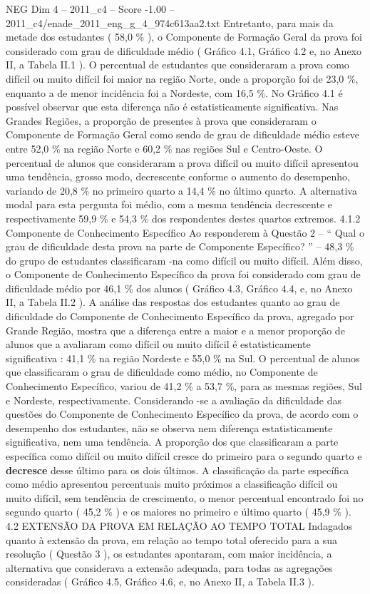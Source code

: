 \begin{textsample}{NEG Dim 4 – 2011\_c4 – Score -1.00 – 2011\_c4/enade\_2011\_eng\_g\_4\_974c613aa2.txt}
Entretanto, para mais da metade dos estudantes ( 58,0 \% ), o Componente de Formação Geral da prova foi considerado com grau de dificuldade médio ( Gráfico 4.1, Gráfico 4.2 e, no Anexo II, a Tabela II.1 ).
O percentual de estudantes que consideraram a prova como difícil ou muito difícil foi maior na região Norte, onde a proporção foi de 23,0 \%, enquanto a de menor incidência foi a Nordeste, com 16,5 \%.
No Gráfico 4.1 é possível observar que esta diferença não é estatisticamente significativa.
Nas Grandes Regiões, a proporção de presentes à prova que consideraram o Componente de Formação Geral como sendo de grau de dificuldade médio esteve entre 52,0 \% na região Norte e 60,2 \% nas regiões Sul e Centro-Oeste.
O percentual de alunos que consideraram a prova difícil ou muito difícil apresentou uma tendência, grosso modo, decrescente conforme o aumento do desempenho, variando de 20,8 \% no primeiro quarto a 14,4 \% no último quarto.
A alternativa modal para esta pergunta foi médio, com a mesma tendência decrescente e respectivamente 59,9 \% e 54,3 \% dos respondentes destes quartos extremos. 4.1.2 Componente de Conhecimento Específico Ao responderem à Questão 2 – “ Qual o grau de dificuldade desta prova na parte de Componente Específico? ” – 48,3 \% do grupo de estudantes classificaram -na como difícil ou muito difícil.
Além disso, o Componente de Conhecimento Específico da prova foi considerado com grau de dificuldade médio por 46,1 \% dos alunos ( Gráfico 4.3, Gráfico 4.4, e, no Anexo II, a Tabela II.2 ).
A análise das respostas dos estudantes quanto ao grau de dificuldade do Componente de Conhecimento Específico da prova, agregado por Grande Região, mostra que a diferença entre a maior e a menor proporção de alunos que a avaliaram como difícil ou muito difícil é estatisticamente significativa : 41,1 \% na região Nordeste e 55,0 \% na Sul.
O percentual de alunos que classificaram o grau de dificuldade como médio, no Componente de Conhecimento Específico, variou de 41,2 \% a 53,7 \%, para as mesmas regiões, Sul e Nordeste, respectivamente.
Considerando -se a avaliação da dificuldade das questões do Componente de Conhecimento Específico da prova, de acordo com o desempenho dos estudantes, não se observa nem diferença estatisticamente significativa, nem uma tendência.
A proporção dos que classificaram a parte específica como difícil ou muito difícil cresce do primeiro para o segundo quarto e \textbf{decresce} desse último para os dois últimos.
A classificação da parte específica como médio apresentou percentuais muito próximos a classificação difícil ou muito difícil, sem tendência de crescimento, o menor percentual encontrado foi no segundo quarto ( 45,2 \% ) e os maiores no primeiro e último quarto ( 45,9 \% ). 4.2 EXTENSÃO DA PROVA EM RELAÇÃO AO TEMPO TOTAL Indagados quanto à extensão da prova, em relação ao tempo total oferecido para a sua resolução ( Questão 3 ), os estudantes apontaram, com maior incidência, a alternativa que considerava a extensão adequada, para todas as agregações consideradas ( Gráfico 4.5, Gráfico 4.6, e, no Anexo II, a Tabela II.3 ).

\end{textsample}
